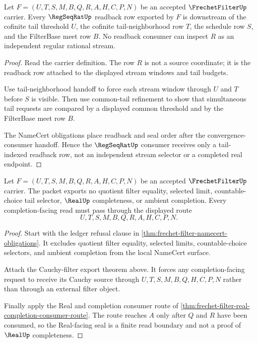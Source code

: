 \begin{theorem}
\label{thm:frechet-filter-regseqrat-tail-readback}
Let $F=(U,T,S,M,B,Q,R,A,H,C,P,N)$ be an accepted $\FrechetFilterUp$ carrier. Every $\RegSeqRatUp$ readback row exported by $F$ is downstream of the cofinite tail threshold $U$, the cofinite tail-neighborhood row $T$, the schedule row $S$, and the FilterBase meet row $B$. No readback consumer can inspect $R$ as an independent regular rational stream.
\end{theorem}
\begin{proof}
Read the carrier definition. The row $R$ is not a source coordinate; it is the readback row attached to the displayed stream windows and tail budgets.

Use tail-neighborhood handoff to force each stream window through $U$ and $T$ before $S$ is visible. Then use common-tail refinement to show that simultaneous tail requests are compared by a displayed common threshold and by the FilterBase meet row $B$.

The NameCert obligations place readback and seal order after the convergence-consumer handoff. Hence the $\RegSeqRatUp$ consumer receives only a tail-indexed readback row, not an independent stream selector or a completed real endpoint.
\end{proof}

\begin{theorem}
\label{thm:frechet-filter-completion-nonescape}
Let $F=(U,T,S,M,B,Q,R,A,H,C,P,N)$ be an accepted $\FrechetFilterUp$ carrier. The packet exports no quotient filter equality, selected limit, countable-choice tail selector, $\RealUp$ completeness, or ambient completion. Every completion-facing read must pass through the displayed route
$$
U,T,S,M,B,Q,R,A,H,C,P,N .
$$
\end{theorem}
\begin{proof}
Start with the ledger refusal clause in \autoref{thm:frechet-filter-namecert-obligations}. It excludes quotient filter equality, selected limits, countable-choice selectors, and ambient completion from the local NameCert surface.

Attach the Cauchy-filter export theorem above. It forces any completion-facing request to receive its Cauchy source through $U,T,S,M,B,Q,H,C,P,N$ rather than through an external filter object.

Finally apply the Real and completion consumer route of \autoref{thm:frechet-filter-real-completion-consumer-route}. The route reaches $A$ only after $Q$ and $R$ have been consumed, so the Real-facing seal is a finite read boundary and not a proof of $\RealUp$ completeness.
\end{proof}

